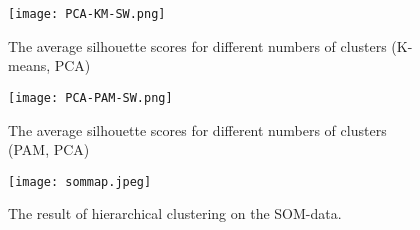\documentclass[11pt,twoside,swedish]{article}
\begin{document}
\begin{figure}
\centering
\texttt{[image: PCA-KM-SW.png]}
\caption{The average silhouette scores for different numbers of
  clusters (K-means, PCA)}
\end{figure}

\begin{table}[ht]
\centering
{}
\caption{The result of k-means clustering on the PCA data.}
\end{table}


\begin{figure}
\centering
\texttt{[image: PCA-PAM-SW.png]}
\caption{The average silhouette scores for different numbers of
  clusters (PAM, PCA)}
\end{figure}

\begin{table}[ht]
\centering
{}
\caption{The result of PAM clustering on the PCA data.}
\end{table}

\begin{figure}[!ht]
\begin{center}
\texttt{[image: sommap.jpeg]}
\caption{The result of hierarchical clustering on the SOM-data.}
\label{mini 4 som}
\end{center}
\end{figure}

\newpage
\printbibliography
\end{document}
